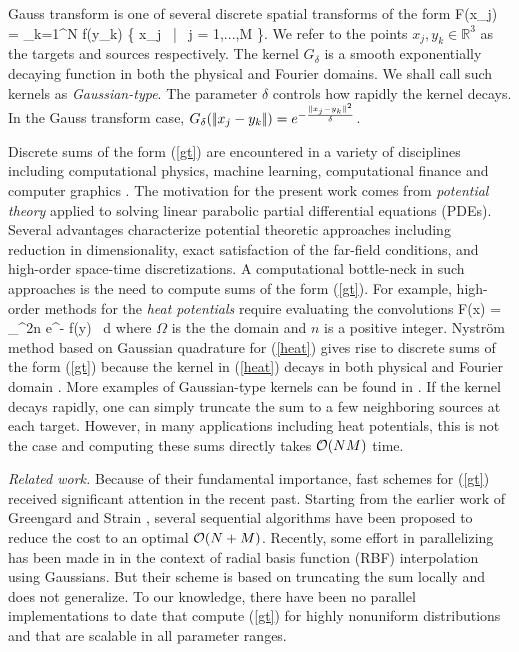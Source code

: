 
Gauss transform is one of several discrete spatial transforms of the form 
%
\beq F(x_j) = \sum_{k=1}^N  f(y_k) \quad {} \quad \{ x_j \, | \, j = 1,...,M \}.  \label{gt} \eeq
%
We refer to the points $ x_j, y_k \in \mathbb{R}^3 $ as the targets and sources respectively. The kernel $G_\delta$ is a smooth exponentially decaying function in both the physical and Fourier domains. We shall call such kernels as {\em Gaussian-type}. The parameter $\delta$ controls how rapidly the kernel decays.  In the Gauss transform case, $G_\delta (|\!| x_j - y_k |\!|) = e^{-\frac{|\!| x_j - y_k |\!|^2}{\delta}}$. 

Discrete sums of the form (\ref{gt}) are encountered in a variety of disciplines including computational physics,
 machine learning, computational finance and computer graphics \cite{strain94adap, elgammal03, broadie03, kim05, veerapaneni08}. The motivation for the present work comes from {\em potential theory} \cite{kress99} applied to solving linear parabolic partial differential equations (PDEs). Several advantages characterize potential theoretic approaches including reduction in dimensionality, exact satisfaction of the far-field conditions, and high-order space-time discretizations. A computational bottle-neck in such approaches is the need to compute sums of the form (\ref{gt}). For example, high-order methods for the {\em heat potentials} require evaluating the convolutions \cite{li09, skv09}
% 
\beq F(x) = \int_\Omega {}^{2n} e^{-} f(y) \, d\Omega \label{heat} \eeq
% 
where $\Omega$ is the the domain and $n$ is a positive integer. Nystr\"{o}m method based on Gaussian quadrature for (\ref{heat}) gives rise to discrete sums of the form (\ref{gt}) because the kernel in (\ref{heat}) decays in both physical and Fourier domain \cite{fggt}. More examples of Gaussian-type kernels can be found in \cite{victor03}. If the kernel decays rapidly, one can simply truncate the sum to a few neighboring sources at each target. However, in many applications including heat potentials, this is not the case and computing these sums directly takes $\mathcal{O}(NM)$ time. 

{\em Related work.} Because of their fundamental importance, fast schemes for (\ref{gt}) received significant attention in the recent past. Starting from the earlier work of Greengard and Strain \cite{fgt}, several sequential algorithms \cite{greengard98, sun02, duraiswami03, tausch09, fggt} have been proposed to reduce the cost to an optimal $\mathcal{O}(N+M)$. Recently, some effort in parallelizing has been made in \cite{rio09} in the context of radial basis function (RBF) interpolation using Gaussians. But their scheme is based on truncating the sum locally and does not generalize. To our knowledge, there have been no parallel implementations to date that compute (\ref{gt}) for highly nonuniform distributions and that are scalable in all parameter ranges. 

